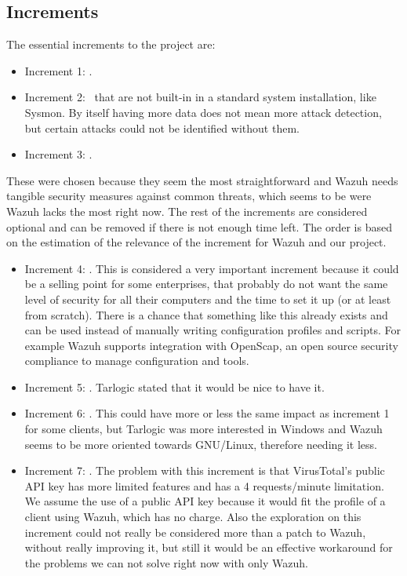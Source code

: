 \subsection{Increments} \label{increments}
The essential increments to the project are:
\begin{itemize}
	\item Increment 1: \IncrementoUno.
	\item Increment 2: \IncrementoDos \ that are not built-in in a standard system installation, like Sysmon. By itself having more data does not mean more attack detection, but certain attacks could not be identified without them.
	\item Increment 3: \IncrementoTres.
\end{itemize}
\linej
These were chosen because they seem the most straightforward and Wazuh needs tangible security measures against common threats, which seems to be were Wazuh lacks the most right now.
\linej
\linej
The rest of the increments are considered optional and can be removed if there is not enough time left. The order is based on the estimation of the relevance of the increment for Wazuh and our project.
\begin{itemize}
	\item Increment 4: \IncrementoCuatro. This is considered a very important increment because it could be a selling point for some enterprises, that probably do not want the same level of security for all their computers and the time to set it up (or at least from scratch). There is a chance that something like this already exists and can be used instead of manually writing configuration profiles and scripts. For example Wazuh supports integration with OpenScap, an open source security compliance to manage configuration and tools.
	\item Increment 5: \IncrementoCinco. Tarlogic stated that it would be nice to have it.
	\item Increment 6: \IncrementoSeis. This could have more or less the same impact as increment 1 for some clients, but Tarlogic was more interested in Windows and Wazuh seems to be more oriented towards GNU/Linux, therefore needing it less.
	\item Increment 7: \IncrementoSiete. The problem with this increment is that VirusTotal's public API key has more limited features and has a 4 requests/minute limitation\cite{virustotal_faq}. We assume the use of a public API key because it would fit the profile of a client using Wazuh, which has no charge. Also the exploration on this increment could not really be considered more than a patch to Wazuh, without really improving it, but still it would be an effective workaround for the problems we can not solve right now with only Wazuh.
\end{itemize}

